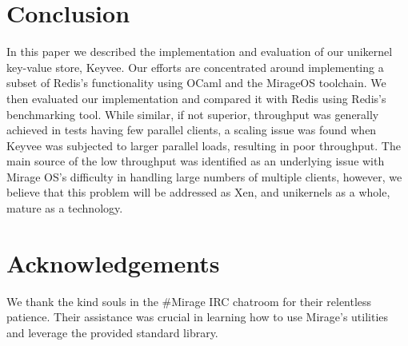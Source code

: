 \documentclass[english,10pt,twocolumn]{article}
\begin{document}
\section{Conclusion}
In this paper we described the implementation and evaluation of our unikernel key-value store, Keyvee.
Our efforts are concentrated around implementing a subset of Redis's functionality using OCaml and the MirageOS toolchain.
We then evaluated our implementation and compared it with Redis using Redis's benchmarking tool.
While similar, if not superior, throughput was generally achieved in tests having few parallel clients, a scaling issue was found when Keyvee was subjected to larger parallel loads, resulting in poor throughput.
The main source of the low throughput was identified as an underlying issue with Mirage OS's difficulty in handling large numbers of multiple clients, however, we believe that this problem will be addressed as Xen, and unikernels as a whole, mature as a technology.

\section{Acknowledgements}
We thank the kind souls in the \#Mirage IRC chatroom for their relentless patience.
Their assistance was crucial in learning how to use Mirage's utilities and leverage the provided standard library.





\end{document}
